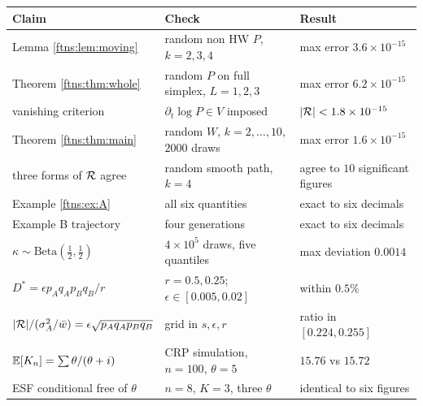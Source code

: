 \begin{center}
\begin{tabularx}{\textwidth}{l>{\raggedright\arraybackslash}X>{\raggedright\arraybackslash}X}
\toprule
Claim & Check & Result \\
\midrule
Lemma \ref{ftns:lem:moving} & random non HW $P$, $k=2,3,4$ & max error $3.6\times10^{-15}$ \\
Theorem \ref{ftns:thm:whole} & random $P$ on full simplex, $L=1,2,3$ & max error $6.2\times10^{-15}$ \\
vanishing criterion & $\partial_t\log P\in V$ imposed & $|\mathcal{R}|<1.8\times10^{-15}$ \\
Theorem \ref{ftns:thm:main} & random $W$, $k=2,\dots,10$, $2000$ draws & max error $1.6\times10^{-15}$ \\
three forms of $\mathcal{R}$ agree & random smooth path, $k=4$ & agree to $10$ significant figures \\
Example \ref{ftns:ex:A} & all six quantities & exact to six decimals \\
Example B trajectory & four generations & exact to six decimals \\
$\kappa\sim\text{Beta}(\tfrac12,\tfrac12)$ & $4\times10^5$ draws, five quantiles & max deviation $0.0014$ \\
$D^\ast=\epsilon p_Aq_Ap_Bq_B/r$ & $r=0.5,0.25$; $\epsilon\in[0.005,0.02]$ & within $0.5\%$ \\
$|\mathcal{R}|/(\sigma^{2}_{A}/\bar{w})=\epsilon\sqrt{p_Aq_Ap_Bq_B}$ & grid in $s,\epsilon,r$ & ratio in $[0.224,0.255]$ \\
$\mathbb{E}[K_n]=\sum\theta/(\theta+i)$ & CRP simulation, $n=100$, $\theta=5$ & $15.76$ vs $15.72$ \\
ESF conditional free of $\theta$ & $n=8$, $K=3$, three $\theta$ & identical to six figures \\
\bottomrule
\end{tabularx}
\end{center}

